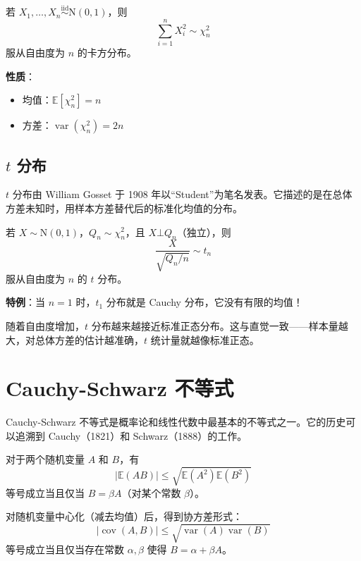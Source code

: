 \begin{Definition}[卡方分布]\label{def:chi-square}
若 $X_1, \ldots, X_n \stackrel{\mathrm{iid}}{\sim} \mathrm{N}(0,1)$，则
\[
\sum_{i=1}^n X_i^2 \sim \chi_n^2
\]
服从自由度为 $n$ 的卡方分布。
\end{Definition}

\textbf{性质}：
\begin{itemize}
  \item 均值：$\mathbb{E}[\chi_n^2] = n$
  \item 方差：$\operatorname{var}(\chi_n^2) = 2n$
\end{itemize}

\subsection{$t$ 分布}

$t$ 分布由 William Gosset 于 1908 年以``Student''为笔名发表。它描述的是在总体方差未知时，用样本方差替代后的标准化均值的分布。

\begin{Definition}[$t$ 分布]\label{def:t-distribution}
若 $X \sim \mathrm{N}(0,1)$，$Q_n \sim \chi_n^2$，且 $X \bot Q_n$（独立），则
\[
\frac{X}{\sqrt{Q_n/n}} \sim t_n
\]
服从自由度为 $n$ 的 $t$ 分布。
\end{Definition}

\textbf{特例}：当 $n=1$ 时，$t_1$ 分布就是 Cauchy 分布，它没有有限的均值！

随着自由度增加，$t$ 分布越来越接近标准正态分布。这与直觉一致——样本量越大，对总体方差的估计越准确，$t$ 统计量就越像标准正态。

\section{Cauchy-Schwarz 不等式}\label{sec:cauchy-schwarz}

Cauchy-Schwarz 不等式是概率论和线性代数中最基本的不等式之一。它的历史可以追溯到 Cauchy（1821）和 Schwarz（1888）的工作。

\begin{Theorem}\label{def:cauchy-schwarz}
对于两个随机变量 $A$ 和 $B$，有
\[
|\mathbb{E}(AB)| \leq \sqrt{\mathbb{E}(A^2)\mathbb{E}(B^2)}
\]
等号成立当且仅当 $B = \beta A$（对某个常数 $\beta$）。
\end{Theorem}

对随机变量中心化（减去均值）后，得到协方差形式：
\[
|\operatorname{cov}(A, B)| \leq \sqrt{\operatorname{var}(A)\operatorname{var}(B)}
\]
等号成立当且仅当存在常数 $\alpha, \beta$ 使得 $B = \alpha + \beta A$。

